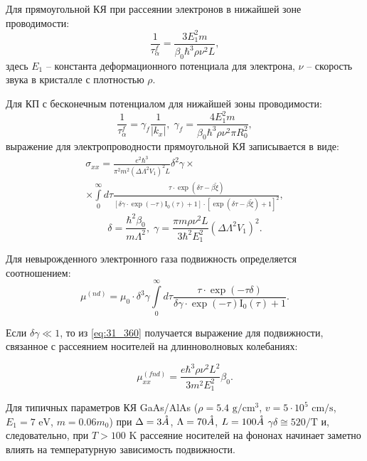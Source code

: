 Для прямоугольной КЯ при рассеянии электронов в нижайшей зоне проводимости:
\begin{equation} \label{eq:31_330}
\frac{1}{\tau_{\alpha }^f } = \frac{3 E_1^2 m}{\beta_0 \hbar^3 \rho \nu^2 L},
\end{equation}
здесь $E_1 $ -- константа деформационного потенциала для электрона, $\nu $ -- скорость звука в кристалле с плотностью $\rho $.

Для КП с бесконечным потенциалом для нижайшей зоны проводимости:
\begin{equation} \label{eq:31_340}
\frac{1}{\tau _{\alpha }^f } =\gamma_f \frac{1}{\left|k_{x} \right|}, \;
\gamma_f =\frac{4 E_1^2 m}{\beta_0 \hbar^3 \rho \nu^2 \pi R_0^2 },
\end{equation}
выражение для электропроводности прямоугольной КЯ записывается в виде:
\begin{multline} \label{eq:31_350}
\sigma _{xx} =\frac{e^2 \hbar^3 }{\pi^2 m^2 \left(\Delta \Lambda^2 V_1 \right)^2 L} \delta^2 \gamma \times \\
 \times \int\limits_0^{\infty }{d\tau \frac{\tau \cdot \exp (\delta \tau -\beta \tilde{\xi })}{\left[\delta \gamma \cdot \exp(-\tau ) \mathrm{I}_0 (\tau )+1\right]\cdot \left[\exp(\delta \tau -\beta \tilde{\xi })+1\right]^{2} }},
\end{multline}
\[
\delta =\frac{\hbar^2 \beta_0 }{m \Lambda^2 }, \;
\gamma =\frac{\pi m\rho \nu^2 L}{3\hbar^2 E_1^2 } \left(\Delta \Lambda^2 V_1 \right)^2 .
\]
 
Для невырожденного электронного газа подвижность определяется соотношением:
\begin{equation} \label{eq:31_360}
\mu ^{(nd)} =\mu_0 \cdot \delta^3 \gamma \int\limits_0^{\infty}{d\tau \frac{\tau \cdot \exp(-\tau \delta )}{\delta \gamma \cdot \exp(-\tau ) \mathrm{I}_0 (\tau )+1}}. 
\end{equation}

Если $\delta \gamma \ll 1$, то из \eqref{eq:31_360} получается выражение для подвижности, связанное с рассеянием носителей на длинноволновых колебаниях:

\begin{equation} \label{eq:31_370}
\mu _{xx}^{(fnd)} =\frac{e\hbar ^{3} \rho \nu ^{2} L^{2} }{3m^{2} E_{1}^{2} } \beta _{0}. 
\end{equation}

Для типичных параметров КЯ GaAs/AlAs ($\rho =5.4 \text{ g} / \text{cm}^3 $, $v=5\cdot 10^5 \text{ cm/s}$, $E_1 =7 \text{ eV}$, $m=0.06m_{0} $) при $\Delta =3 \AA$, $\Lambda =70 \AA$, $L = 100 \AA$  $\gamma \delta \cong 520/\text{T}$ и, следовательно, при $T>100\text{ K}$ рассеяние носителей на фононах начинает заметно влиять на температурную зависимость подвижности.

